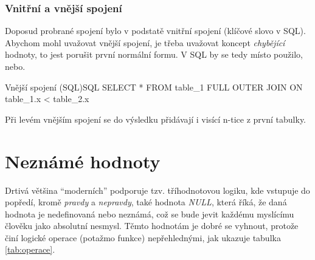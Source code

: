 \subsubsection{Vnitřní a vnější spojení}
Doposud probrané spojení bylo v podstatě vnitřní spojení (klíčové slovo v SQL). Abychom mohl uvažovat vnější spojení, je třeba uvažovat koncept \textit{chybějící} hodnoty, to jest porušit první normální formu. V SQL by se tedy místo použilo, nebo.
\begin{upcode}{Vnější spojení (SQL)}{}{SQL}
SELECT * FROM table_1 FULL OUTER JOIN ON table_1.x < table_2.x
\end{upcode}
Při levém vnějším spojení se do výsledku přidávají i visící n-tice z první tabulky.

\section{Neznámé hodnoty}
Drtivá většina \enquote{moderních}  podporuje tzv. tříhodnotovou logiku, kde vstupuje do popředí, kromě \textit{pravdy} a \textit{nepravdy}, také hodnota \textit{NULL}, která říká, že daná hodnota je nedefinovaná nebo neznámá, což se bude jevit každému myslícímu člověku jako absolutní nesmysl. Těmto hodnotám je dobré se vyhnout, protože činí logické operace (potažmo funkce) nepřehlednými, jak ukazuje tabulka \ref{tab:operace}.


